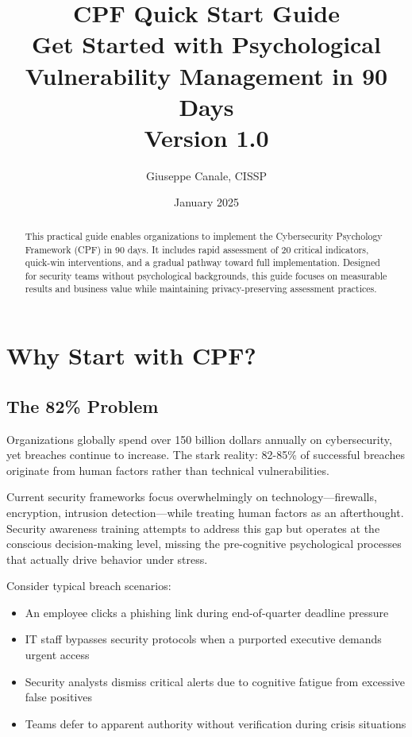 \documentclass[11pt,a4paper]{article}
\title{\textbf{CPF Quick Start Guide}\\
\large Get Started with Psychological Vulnerability Management in 90 Days\\
\large Version 1.0}
\author{Giuseppe Canale, CISSP}
\date{January 2025}
\begin{document}
\maketitle

\begin{abstract}
This practical guide enables organizations to implement the Cybersecurity Psychology Framework (CPF) in 90 days. It includes rapid assessment of 20 critical indicators, quick-win interventions, and a gradual pathway toward full implementation. Designed for security teams without psychological backgrounds, this guide focuses on measurable results and business value while maintaining privacy-preserving assessment practices.
\end{abstract}

\tableofcontents
\newpage

\section{Why Start with CPF?}

\subsection{The 82\% Problem}

Organizations globally spend over 150 billion dollars annually on cybersecurity, yet breaches continue to increase. The stark reality: 82-85\% of successful breaches originate from human factors rather than technical vulnerabilities.

Current security frameworks focus overwhelmingly on technology---firewalls, encryption, intrusion detection---while treating human factors as an afterthought. Security awareness training attempts to address this gap but operates at the conscious decision-making level, missing the pre-cognitive psychological processes that actually drive behavior under stress.

Consider typical breach scenarios:
\begin{itemize}
\item An employee clicks a phishing link during end-of-quarter deadline pressure
\item IT staff bypasses security protocols when a purported executive demands urgent access
\item Security analysts dismiss critical alerts due to cognitive fatigue from excessive false positives
\item Teams defer to apparent authority without verification during crisis situations
\end{itemize}
\end{document}
